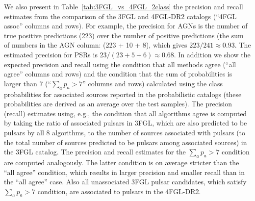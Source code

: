 We also present in Table~\ref{tab:3FGL_vs_4FGL_2class} the precision and recall estimates from the comparison of the 3FGL and 4FGL-DR2 catalogs (``4FGL assoc'' columns and rows).
For example, the precision for AGNs is the number of true positive predictions (223) over the number of positive predictions (the sum of numbers in the AGN column: (223 + 10 + 8), which gives $223 / 241 \approx 0.93$.
The estimated precision for PSRs is $ 23 / (23 + 5 + 6) \approx 0.68$.
In addition we show the expected precision and recall using the condition that all
methods agree (``all agree'' columns and rows) and the condition that the sum of probabilities is larger than 7 (``$\sum_a p_a > 7$'' columns and rows) calculated using the class probabilities for associated sources reported in the probabilistic catalogs (these probabilities are derived as an average over the test samples).
The precision (recall) estimates using, e.g., the condition that all algorithms agree is computed by taking the ratio of associated pulsars in 3FGL, which are also predicted to be pulsars by all 8 algorithms, to the number of sources associated with pulsars (to the total number of sources predicted to be pulsars among associated sources) in the 3FGL catalog.
The precision and recall estimates for the $\sum_a p_a > 7$ condition are computed analogously.
The latter condition is on average stricter than the ``all agree'' condition, which results in larger precision and smaller recall than in the ``all agree'' case.
Also all unassociated 3FGL pulsar candidates, which satisfy $\sum_a p_a > 7$ condition, are associated to pulsars in the 4FGL-DR2.

